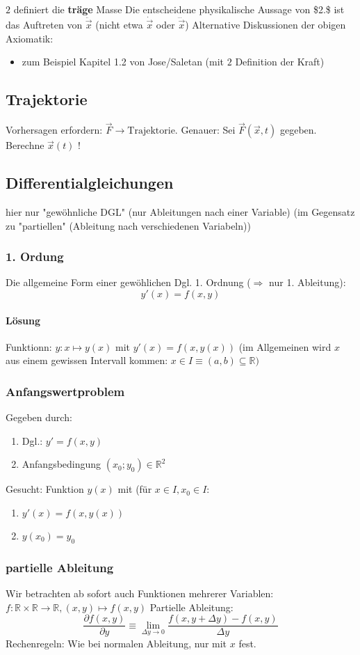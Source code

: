 \documentclass[a4paper]{scrartcl}
\newcommand{\f}[2]{\frac{#1}{#2}}
\renewcommand{\v}[1]{\vec{#1}}
\theoremstyle{definition}
\theoremstyle{plain}
\theoremstyle{remark}
\begin{document}
$2$ definiert die \textbf{träge} Masse
Die entscheidene physikalische Aussage von \$2.\$ ist das Auftreten von $\ddot{\v x}$ (nicht etwa $\dot{\v x}$ oder $\dddot{\v x}$)
Alternative Diskussionen der obigen Axiomatik:
\begin{itemize}
\item zum Beispiel Kapitel 1.2 von Jose/Saletan (mit $2$ Definition der Kraft)
\end{itemize}
\subsection{Trajektorie}
\label{sec-3-2}
Vorhersagen erfordern: $\v F \rightarrow \text{Trajektorie}$. Genauer: Sei $\v F(\v x,t)$ gegeben. Berechne $\v x(t)$ !
\subsection{Differentialgleichungen}
\label{sec-3-3}
hier nur "gewöhnliche DGL" (nur Ableitungen nach einer Variable) (im Gegensatz zu "partiellen" (Ableitung nach verschiedenen Variabeln))
\subsubsection{1. Ordung}
\label{sec-3-3-1}
Die allgemeine Form einer gewöhlichen Dgl. 1. Ordnung ($\Rightarrow$ nur 1. Ableitung):
\[y'(x) = f(x,y)\]
\paragraph{Lösung}
\label{sec-3-3-1-1}
Funktionn: $y:x\mapsto y(x)$ mit $y'(x) = f(x,y(x))$ (im Allgemeinen wird $x$ aus einem gewissen Intervall kommen: $x\in I\equiv (a,b)\subseteq \mathbb{R})$
\subsubsection{Anfangswertproblem}
\label{sec-3-3-2}
Gegeben durch:
\begin{enumerate}
\item Dgl.: $y' = f(x,y)$
\item Anfangsbedingung $(x_0;y_0) \in \mathbb{R}^2$
\end{enumerate}
Gesucht: Funktion $y(x)$ mit (für $x\in I, x_0 \in I$:
\begin{enumerate}
\item $y'(x) = f(x,y(x))$
\item $y(x_0) = y_0$
\end{enumerate}
\subsubsection{partielle Ableitung}
\label{sec-3-3-3}
Wir betrachten ab sofort auch Funktionen mehrerer Variablen: $f:\mathbb{R}\times\mathbb{R}\to\mathbb{R},(x,y)\mapsto f(x,y)$
Partielle Ableitung: \[\f{\partial f(x,y)}{\partial y} \equiv \lim_{\Delta y \to 0} \f{f(x,y + \Delta y) - f(x,y)}{\Delta y}\]
Rechenregeln: Wie bei normalen Ableitung, nur mit $x$ fest.
\end{document}
